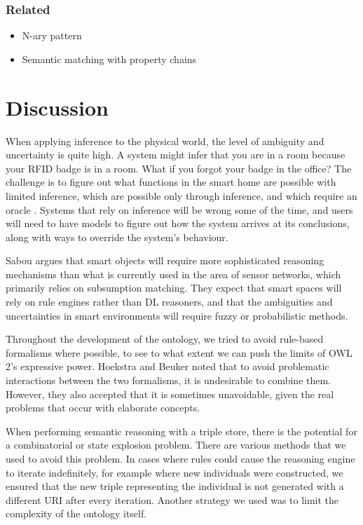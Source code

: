 \subsubsection{Related} 

\begin{itemize}
	\item N-ary pattern 
	\item Semantic matching with property chains
\end{itemize}


\section{Discussion}

When applying inference to the physical world, the level of ambiguity and uncertainty is quite high. A system might infer that you are in a room because your RFID badge is in a room. What if you forgot your badge in the office? The challenge is to figure out what functions in the smart home are possible with limited inference, which are possible only through inference, and which require an oracle \cite{Edwards2001}. Systems that rely on inference will be wrong some of the time, and users will need to have models to figure out how the system arrives at its conclusions, along with ways to override the system's behaviour.

Sabou \cite{Sabou2010} argues that smart objects will require more sophisticated reasoning mechanisms than what is currently used in the area of sensor networks, which primarily relies on subsumption matching. They expect that smart spaces will rely on rule engines rather than DL reasoners, and that the ambiguities and uncertainties in smart environments will require fuzzy or probabilistic methods.

Throughout the development of the ontology, we tried to avoid rule-based formalisms where possible, to see to what extent we can push the limits of OWL 2's expressive power. Hoekstra and Beuker \cite{Hoekstra2008} noted that to avoid problematic interactions between the two formalisms, it is undesirable to combine them. However, they also accepted that it is sometimes unavoidable, given the real problems that occur with elaborate concepts. 

When performing semantic reasoning with a triple store, there is the potential for a combinatorial or state explosion problem. There are various methods that we used to avoid this problem. In cases where rules could cause the reasoning engine to iterate indefinitely, for example where new individuals were constructed, we ensured that the new triple representing the individual is not generated with a different \ac{URI} after every iteration. Another strategy we used was to limit the complexity of the ontology itself.

